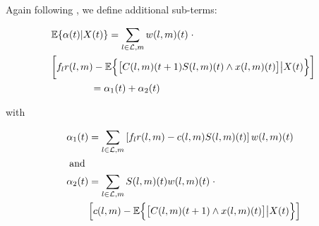 Again following \cite{MaxPressureStochastic}, we define additional sub-terms:
\begin{small}
\begin{align} \label{expected_short}
 & \mathbb{E}\{\alpha (t) | X(t)\} = \sum_{l \in \linkset,m} w(l,m)(t) \; \cdot   \\
 \nonumber  & \bigg[ f_l r(l,m) - \expectation{ \big[C(l,m)(t+1)S(l,m)(t)\wedge x(l,m)(t)\big] \big| X(t)}  \bigg]   \\  
 & \qquad \qquad = \alpha_1 (t) + \alpha_2 (t) \nonumber
\end{align}
\end{small}
with 
\begin{small}
\begin{align} \label{a1_def}
\alpha_1 (t) &=  \sum_{l \in \linkset,m} \left[ f_l r(l,m) - c(l,m)S(l,m)(t) \right] w(l,m)(t)   \\
\nonumber \text{ and }&  \\  \nonumber
 \alpha_2 (t) & =  \sum_{l \in \linkset,m}S(l,m)(t)w(l,m)(t)  \; \cdot   \\ 
&\Big[ c(l,m)- \expectation{ \big[C  (l,m)(t+1)\wedge x(l,m)(t)\big] \big| X(t) }  \Big]  
\end{align}
\end{small}

